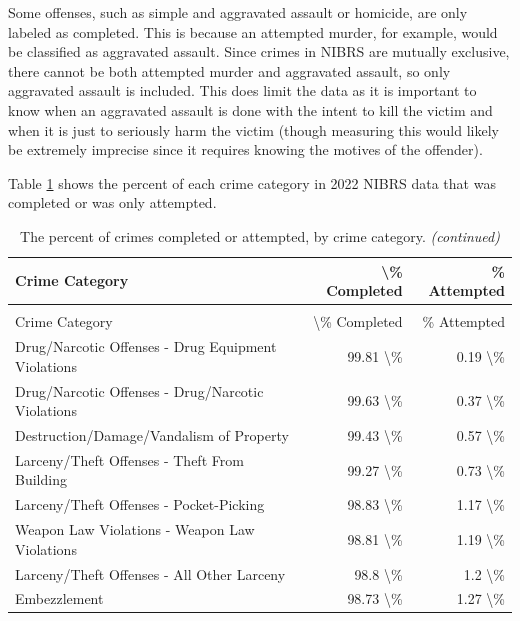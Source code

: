 \documentclass[
]{krantz}
\begin{document}
Some offenses, such as simple and aggravated assault or
homicide, are only labeled as completed. This is because an
attempted murder, for example, would be classified as
aggravated assault. Since crimes in NIBRS are mutually
exclusive, there cannot be both attempted murder and
aggravated assault, so only aggravated assault is included.
This does limit the data as it is important to know when an
aggravated assault is done with the intent to kill the
victim and when it is just to seriously harm the victim
(though measuring this would likely be extremely imprecise
since it requires knowing the motives of the offender).

Table \ref{tab:offensesCompleted} shows the percent of each
crime category in 2022 NIBRS data that was completed or was
only attempted.

\begin{longtable}[t]{l|r|r}
\caption{\label{tab:offensesCompleted}The percent of crimes completed or attempted, by crime category.}\\
\hline
Crime Category & \textbackslash{}\% Completed & \% Attempted\\
\hline
\endfirsthead
\caption[]{\label{tab:offensesCompleted}The percent of crimes completed or attempted, by crime category. \textit{(continued)}}\\
\hline
Crime Category & \textbackslash{}\% Completed & \% Attempted\\
\hline
\endhead
Drug/Narcotic Offenses - Drug Equipment Violations & 99.81 \textbackslash{}\% & 0.19 \textbackslash{}\%\\
\hline
Drug/Narcotic Offenses - Drug/Narcotic Violations & 99.63 \textbackslash{}\% & 0.37 \textbackslash{}\%\\
\hline
Destruction/Damage/Vandalism of Property & 99.43 \textbackslash{}\% & 0.57 \textbackslash{}\%\\
\hline
Larceny/Theft Offenses - Theft From Building & 99.27 \textbackslash{}\% & 0.73 \textbackslash{}\%\\
\hline
Larceny/Theft Offenses - Pocket-Picking & 98.83 \textbackslash{}\% & 1.17 \textbackslash{}\%\\
\hline
Weapon Law Violations - Weapon Law Violations & 98.81 \textbackslash{}\% & 1.19 \textbackslash{}\%\\
\hline
Larceny/Theft Offenses - All Other Larceny & 98.8 \textbackslash{}\% & 1.2 \textbackslash{}\%\\
\hline
Embezzlement & 98.73 \textbackslash{}\% & 1.27 \textbackslash{}\%\\

\end{longtable}
\end{document}
